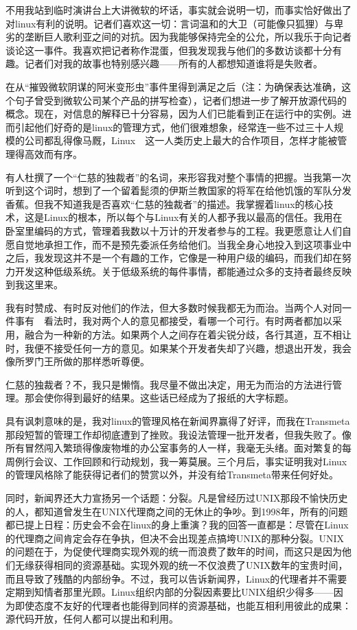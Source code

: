 不用我站到临时演讲台上大讲微软的坏话，事实就会说明一切，而事实恰好做出了对linux有利的说明。记者们喜欢这一切：言词温和的大卫（可能像只狐狸）与卑劣的垄断巨人歌利亚之间的对抗。因为我能够保持完全的公允，所以我乐于向记者谈论这一事件。我喜欢把记者称作混蛋，但我发现我与他们的多数访谈都十分有趣。记者们对我的故事也特别感兴趣——所有的人都想知道谁将是失败者。

在从“摧毁微软阴谋的阿米变形虫”事件里得到满足之后（注：为确保表达准确，这个句子曾受到微软公司某个产品的拼写检查），记者们想进一步了解开放源代码的概念。现在，对信息的解释已十分容易，因为人们已能看到正在运行中的实例。进而引起他们好奇的是linux的管理方式，他们很难想象，经常连一些不过三十人规模的公司都乱得像马厩，Linux　这一人类历史上最大的合作项目，怎样才能被管理得高效而有序。

有人杜撰了一个“仁慈的独裁者”的名词，来形容我对整个事情的把握。当我第一次听到这个词时，想到了一个留着髭须的伊斯兰教国家的将军在给他饥饿的军队分发香蕉。但我不知道我是否喜欢“仁慈的独裁者”的描述。我掌握着linux的核心技术，这是Linux的根本，所以每个与Linux有关的人都予我以最高的信任。我用在卧室里编码的方式，管理着我数以十万计的开发者参与的工程。我更愿意让人们自愿自觉地承担工作，而不是预先委派任务给他们。当我全身心地投入到这项事业中之后，我发现这并不是一个有趣的工作，它像是一种用户级的编码，而我们却在努力开发这种低级系统。关于低级系统的每件事情，都能通过众多的支持者最终反映到我这里来。

我有时赞成、有时反对他们的作法，但大多数时候我都无为而治。当两个人对同一件事有　看法时，我对两个人的意见都接受，看哪一个可行。有时两者都加以采用，融合为一种新的方法。如果两个人之间存在着尖锐分歧，各行其道，互不相让时，我便不接受任何一方的意见。如果某个开发者失却了兴趣，想退出开发，我会像所罗门王所做的那样悉听尊便。

仁慈的独裁者？不，我只是懒惰。我尽量不做出决定，用无为而治的方法进行管理。那会使你得到最好的结果。这些话已经成为了报纸的大字标题。

具有讽刺意味的是，我对linux的管理风格在新闻界赢得了好评，而我在Transmeta那段短暂的管理工作却彻底遭到了挫败。我设法管理一批开发者，但我失败了。像所有冒然闯入繁琐得像废物堆的办公室事务的人一样，我毫无头绪。面对繁复的每周例行会议、工作回顾和行动规划，我一筹莫展。三个月后，事实证明我对Linux的管理风格除了能获得记者们的赞赏以外，并没有给Transmeta带来任何好处。

同时，新闻界还大力宣扬另一个话题：分裂。凡是曾经历过UNIX那段不愉快历史的人，都知道曾发生在UNIX代理商之间的无休止的争吵。到1998年，所有的问题都已提上日程：历史会不会在linux的身上重演？我的回答一直都是：尽管在Linux的代理商之间肯定会存在争执，但决不会出现差点搞垮UNIX的那种分裂。UNIX的问题在于，为促使代理商实现外观的统一而浪费了数年的时间，而这只是因为他们无缘获得相同的资源基础。实现外观的统一不仅浪费了UNIX数年的宝贵时间，而且导致了残酷的内部纷争。不过，我可以告诉新闻界，Linux的代理者并不需要定期到知情者那里光顾。Linux组织内部的分裂因素要比UNIX组织少得多——因为即使态度不友好的代理者也能得到同样的资源基础，也能互相利用彼此的成果：源代码开放，任何人都可以提出和利用。

